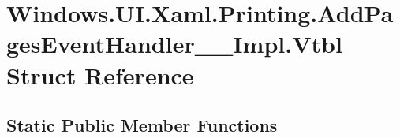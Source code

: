 \hypertarget{struct_windows_1_1_u_i_1_1_xaml_1_1_printing_1_1_add_pages_event_handler_____impl_1_1_vtbl}{}\section{Windows.\+U\+I.\+Xaml.\+Printing.\+Add\+Pages\+Event\+Handler\+\_\+\+\_\+\+Impl.\+Vtbl Struct Reference}
\label{struct_windows_1_1_u_i_1_1_xaml_1_1_printing_1_1_add_pages_event_handler_____impl_1_1_vtbl}
\subsection*{Static Public Member Functions}
